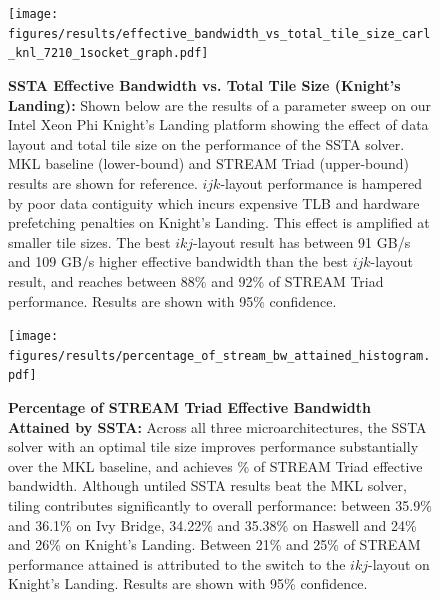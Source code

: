 \documentclass[10pt, conference, compsocconf]{IEEEtran}
\newcommand{\textapprox}{\texttildelow}
\begin{document}
\begin{figure}[!h]
  \centering
  \caption{\small
    \textbf{SSTA Effective Bandwidth vs. Total Tile Size (Knight's Landing):}
    Shown below are the results of a parameter sweep on our Intel Xeon Phi
      Knight's Landing platform showing the effect of data layout and total
      tile size on the performance of the SSTA solver.
    MKL baseline (lower-bound) and STREAM Triad (upper-bound) results are shown
      for reference.
    \(ijk\)-layout performance is hampered by poor data contiguity which incurs
      expensive TLB and hardware prefetching penalties on Knight's Landing.
    This effect is amplified at smaller tile sizes.
    The best \(ikj\)-layout result has between 91 GB/s and 109 GB/s higher
      effective bandwidth than the best \(ijk\)-layout result, and reaches
      between 88\% and 92\% of STREAM Triad performance.
    Results are shown with 95\% confidence.
  }
  \label{fig:results:bw_vs_tile_size_knl}
  \texttt{[image: figures/results/effective\_bandwidth\_vs\_total\_tile\_size\_carl\_knl\_7210\_1socket\_graph.pdf]}
  \vspace{-6mm}
\end{figure}

\begin{figure}[!h]
  \centering
  \caption{\small
    \textbf{Percentage of STREAM Triad Effective Bandwidth Attained by SSTA:}
    Across all three microarchitectures, the SSTA solver with an optimal tile
      size improves performance substantially over the MKL baseline, and
      achieves \textapprox 90\% of STREAM Triad effective bandwidth.
    Although untiled SSTA results beat the MKL solver, tiling contributes
      significantly to overall performance: between 35.9\% and 36.1\% on 
      Ivy Bridge, 34.22\% and 35.38\% on Haswell and 24\% and 26\% on 
      Knight's Landing.
    Between 21\% and 25\% of STREAM performance attained is attributed to the
      switch to the \(ikj\)-layout on Knight's Landing. 
    Results are shown with 95\% confidence.
  }
  \label{fig:results:percent_stream_bw}
  \texttt{[image: figures/results/percentage\_of\_stream\_bw\_attained\_histogram.pdf]}
  \vspace{-6mm}
\end{figure}
\end{document}
